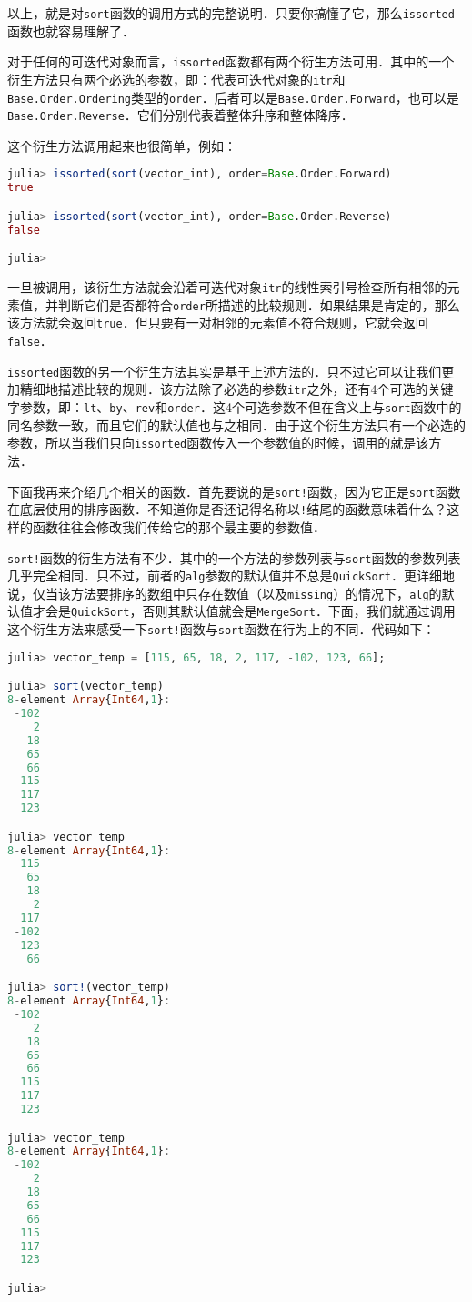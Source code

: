 以上，就是对\verb|sort|函数的调用方式的完整说明．只要你搞懂了它，那么\verb|issorted|函数也就容易理解了．

对于任何的可迭代对象而言，\verb|issorted|函数都有两个衍生方法可用．其中的一个衍生方法只有两个必选的参数，即：代表可迭代对象的\verb|itr|和\verb|Base.Order.Ordering|类型的\verb|order|．后者可以是\verb|Base.Order.Forward|，也可以是\verb|Base.Order.Reverse|．它们分别代表着整体升序和整体降序．

这个衍生方法调用起来也很简单，例如：

\begin{lstlisting}[language=julia]
julia> issorted(sort(vector_int), order=Base.Order.Forward)
true

julia> issorted(sort(vector_int), order=Base.Order.Reverse)
false

julia> 
\end{lstlisting}

一旦被调用，该衍生方法就会沿着可迭代对象\verb|itr|的线性索引号检查所有相邻的元素值，并判断它们是否都符合\verb|order|所描述的比较规则．如果结果是肯定的，那么该方法就会返回\verb|true|．但只要有一对相邻的元素值不符合规则，它就会返回\verb|false|．

\verb|issorted|函数的另一个衍生方法其实是基于上述方法的．只不过它可以让我们更加精细地描述比较的规则．该方法除了必选的参数\verb|itr|之外，还有4个可选的关键字参数，即：\verb|lt|、\verb|by|、\verb|rev|和\verb|order|．这4个可选参数不但在含义上与\verb|sort|函数中的同名参数一致，而且它们的默认值也与之相同．由于这个衍生方法只有一个必选的参数，所以当我们只向\verb|issorted|函数传入一个参数值的时候，调用的就是该方法．

下面我再来介绍几个相关的函数．首先要说的是\verb|sort!|函数，因为它正是\verb|sort|函数在底层使用的排序函数．不知道你是否还记得名称以\verb|!|结尾的函数意味着什么？这样的函数往往会修改我们传给它的那个最主要的参数值．

\verb|sort!|函数的衍生方法有不少．其中的一个方法的参数列表与\verb|sort|函数的参数列表几乎完全相同．只不过，前者的\verb|alg|参数的默认值并不总是\verb|QuickSort|．更详细地说，仅当该方法要排序的数组中只存在数值（以及\verb|missing|）的情况下，\verb|alg|的默认值才会是\verb|QuickSort|，否则其默认值就会是\verb|MergeSort|．下面，我们就通过调用这个衍生方法来感受一下\verb|sort!|函数与\verb|sort|函数在行为上的不同．代码如下：

\begin{lstlisting}[language=julia]
julia> vector_temp = [115, 65, 18, 2, 117, -102, 123, 66];

julia> sort(vector_temp)
8-element Array{Int64,1}:
 -102
    2
   18
   65
   66
  115
  117
  123

julia> vector_temp
8-element Array{Int64,1}:
  115
   65
   18
    2
  117
 -102
  123
   66

julia> sort!(vector_temp)
8-element Array{Int64,1}:
 -102
    2
   18
   65
   66
  115
  117
  123

julia> vector_temp
8-element Array{Int64,1}:
 -102
    2
   18
   65
   66
  115
  117
  123

julia> 
\end{lstlisting}

